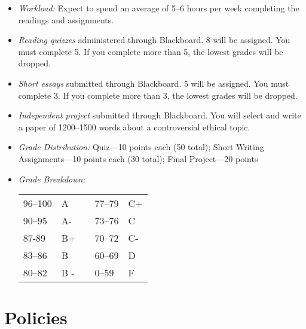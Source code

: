 \documentclass[article,oneside]{memoir}
\begin{document}
\begin{itemize}
\item \textit{Workload:} Expect to spend an average of 5--6 hours per week  completing the readings and assignments.

\item \textit{Reading quizzes} administered through Blackboard. 8 will be assigned. You must complete 5. If you complete more than 5, the lowest grades will be dropped. 

\item \textit{Short essays} submitted through Blackboard. 5 will be assigned. You must complete 3. If you complete more than 3, the lowest grades will be dropped. 

\item \textit{Independent project} submitted through Blackboard. You will select and write a paper of 1200--1500 words about a controversial ethical topic. 
 
\item \textit{Grade Distribution:}  Quiz---10 points each (50 total);  Short Writing Assignments---10 points each (30 total); Final Project---20 points 

\item \textit{Grade Breakdown:}

 \begin{tabular}{ | l | l | p{2cm} | l | l | }
    \hline 
96--100 & A  & &  77--79 &  C+ \\  
90--95 & A- & &  73--76 & C \\
87-89 & B+ &  &  70--72 & C- \\ 
83--86 & B  & &  60--69 & D\\
80--82 & B - & & 0--59 & F\\ \hline
    \end{tabular}


\end{itemize}


\section{Policies}
\end{document}
